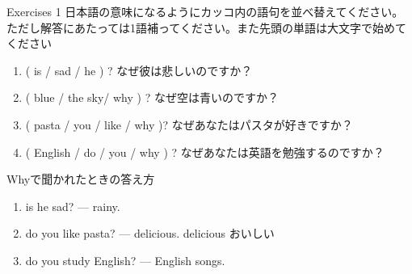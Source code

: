 \documentclass[aspectratio=169,xcolor={dvipsnames,table}]{beamer}
\begin{document}
\begin{frame}[plain]{Exercises 1}
日本語の意味になるようにカッコ内の語句を並べ替えてください。ただし解答にあたっては1語補ってください。また先頭の単語は大文字で始めてください
 \begin{enumerate}
  \item ( is / sad / he ) ? なぜ彼は悲しいのですか？\\
  \item ( blue / the sky/ why ) ? なぜ空は青いのですか？\\
  \item ( pasta / you / like / why )? なぜあなたはパスタが好きですか？\\
  \item ( English / do / you / why ) ? なぜあなたは英語を勉強するのですか？\\
 \end{enumerate}

\hfill{}
\end{frame}
\begin{frame}[plain]{Whyで聞かれたときの答え方}
 \begin{enumerate}
  \item {} is he sad? ---   rainy.
  \item {} do you like pasta? ---   delicious.%
\hfill{\scriptsize delicious  おいしい}
  \item {} do you study English? ---   English songs.
 \end{enumerate}


\hfill{\scriptsize {}}
\end{frame}
\end{document}
